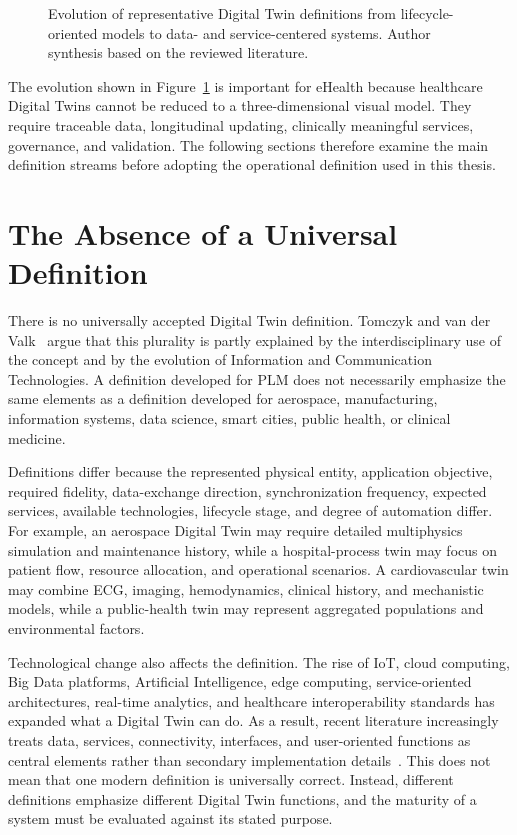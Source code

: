 \begin{figure}[H]
    \centering
    \resizebox{\textwidth}{!}{}
    \caption{Evolution of representative Digital Twin definitions from lifecycle-oriented models to data- and service-centered systems. Author synthesis based on the reviewed literature.}
    \label{fig:dt_definition_evolution}
\end{figure}

The evolution shown in Figure~\ref{fig:dt_definition_evolution} is important for eHealth because healthcare Digital Twins cannot be reduced to a three-dimensional visual model. They require traceable data, longitudinal updating, clinically meaningful services, governance, and validation. The following sections therefore examine the main definition streams before adopting the operational definition used in this thesis.

\section{The Absence of a Universal Definition}
There is no universally accepted Digital Twin definition. Tomczyk and van der Valk~\cite{tomczyk2022paradigm} argue that this plurality is partly explained by the interdisciplinary use of the concept and by the evolution of Information and Communication Technologies. A definition developed for PLM does not necessarily emphasize the same elements as a definition developed for aerospace, manufacturing, information systems, data science, smart cities, public health, or clinical medicine.

Definitions differ because the represented physical entity, application objective, required fidelity, data-exchange direction, synchronization frequency, expected services, available technologies, lifecycle stage, and degree of automation differ. For example, an aerospace Digital Twin may require detailed multiphysics simulation and maintenance history, while a hospital-process twin may focus on patient flow, resource allocation, and operational scenarios. A cardiovascular twin may combine ECG, imaging, hemodynamics, clinical history, and mechanistic models, while a public-health twin may represent aggregated populations and environmental factors.

Technological change also affects the definition. The rise of IoT, cloud computing, Big Data platforms, Artificial Intelligence, edge computing, service-oriented architectures, real-time analytics, and healthcare interoperability standards has expanded what a Digital Twin can do. As a result, recent literature increasingly treats data, services, connectivity, interfaces, and user-oriented functions as central elements rather than secondary implementation details~\cite{tao2019digital,fuller2020digital,tomczyk2022paradigm}. This does not mean that one modern definition is universally correct. Instead, different definitions emphasize different Digital Twin functions, and the maturity of a system must be evaluated against its stated purpose.

